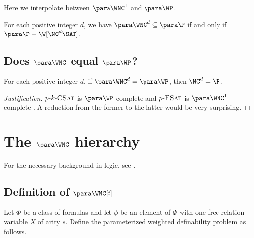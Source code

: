 \documentclass{article}
\newenvironment{justification}{\begin{proof}[Justification]}{\end{proof}}
\newcommand{\dash}{\textnormal{-}}
\begin{document}
Here we interpolate between $\para \WNC^1$ and $\para \WP$.

\begin{conjecture}
  For each positive integer $d$, we have $\para \WNC^d \subseteq \para \P$ if and only if $\para \P = \W[\NC^d \SAT]$.
\end{conjecture}

\subsection{Does \texorpdfstring{$\para \WNC$}{paraWNC} equal \texorpdfstring{$\para \WP$}{paraWP}?}
\label{sec:wncwp}

\begin{conjecture}
  For each positive integer $d$, if $\para \WNC^d = \para \WP$, then $\NC^d = \P$.
\end{conjecture}
\begin{justification}
  $p \dash k \dash \textsc{CSat}$ is $\para \WP$-complete and $p \dash \textsc{FSat}$ is $\para \WNC^1$-complete \autocite[Theorem~3.6]{est15}.
  A reduction from the former to the latter would be very surprising.
\end{justification}

\section{The \texorpdfstring{$\para \WNC$}{paraWNC} hierarchy}

For the necessary background in logic, see \autocite[Chapter~4]{fg06}.

\subsection{Definition of \texorpdfstring{$\para \WNC[t]$}{paraWNC[t]}}

Let $\Phi$ be a class of formulas and let $\phi$ be an element of $\Phi$ with one free relation variable $X$ of arity $s$.
Define the parameterized weighted definability problem as follows.

\end{document}
